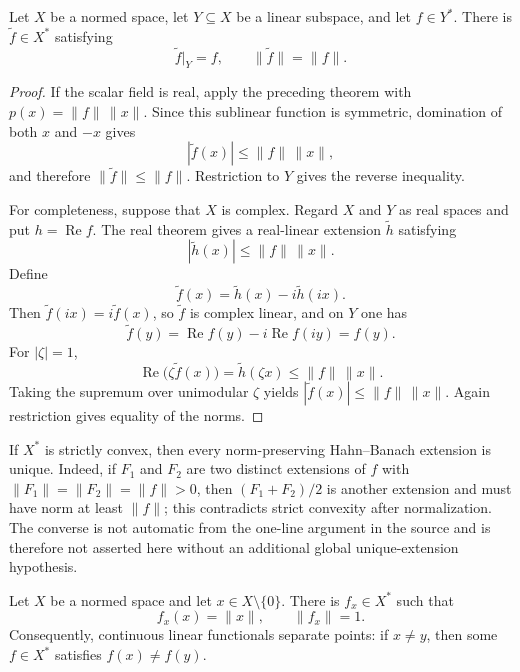 \begin{notecorollary}
Let $X$ be a normed space, let $Y\subseteq X$ be a linear subspace, and let
$f\in Y^*$.  There is $\widetilde f\in X^*$ satisfying
\[
  \widetilde f|_Y=f,
  \qquad
  \|\widetilde f\|=\|f\|.
\]
\end{notecorollary}

\begin{proof}
If the scalar field is real, apply the preceding theorem with
$p(x)=\|f\|\,\|x\|$.  Since this sublinear function is symmetric, domination
of both $x$ and $-x$ gives
\[
  |\widetilde f(x)|\le \|f\|\,\|x\|,
\]
and therefore $\|\widetilde f\|\le\|f\|$.  Restriction to $Y$ gives the
reverse inequality.

For completeness, suppose that $X$ is complex.  Regard $X$ and $Y$ as real
spaces and put $h=\operatorname{Re}f$.  The real theorem gives a real-linear
extension $\widetilde h$ satisfying
\[
  |\widetilde h(x)|\le\|f\|\,\|x\|.
\]
Define
\[
  \widetilde f(x)=\widetilde h(x)-i\widetilde h(ix).
\]
Then $\widetilde f(ix)=i\widetilde f(x)$, so $\widetilde f$ is complex linear,
and on $Y$ one has
\[
  \widetilde f(y)
  =\operatorname{Re}f(y)-i\operatorname{Re}f(iy)
  =f(y).
\]
For $|\zeta|=1$,
\[
  \operatorname{Re}\bigl(\zeta\widetilde f(x)\bigr)
  =\widetilde h(\zeta x)
  \le\|f\|\,\|x\|.
\]
Taking the supremum over unimodular $\zeta$ yields
$|\widetilde f(x)|\le\|f\|\,\|x\|$.  Again restriction gives equality of
the norms.
\end{proof}

\begin{noteremark}
If $X^*$ is strictly convex, then every norm-preserving Hahn--Banach extension
is unique.  Indeed, if $F_1$ and $F_2$ are two distinct extensions of $f$ with
$\|F_1\|=\|F_2\|=\|f\|>0$, then $(F_1+F_2)/2$ is another extension and must
have norm at least $\|f\|$; this contradicts strict convexity after
normalization.  The converse is not automatic from the one-line argument in
the source and is therefore not asserted here without an additional global
unique-extension hypothesis.
\end{noteremark}

\begin{noteproposition}
Let $X$ be a normed space and let $x\in X\setminus\{0\}$.  There is
$f_x\in X^*$ such that
\[
  f_x(x)=\|x\|,
  \qquad
  \|f_x\|=1.
\]
Consequently, continuous linear functionals separate points: if $x\ne y$,
then some $f\in X^*$ satisfies $f(x)\ne f(y)$.
\end{noteproposition}

